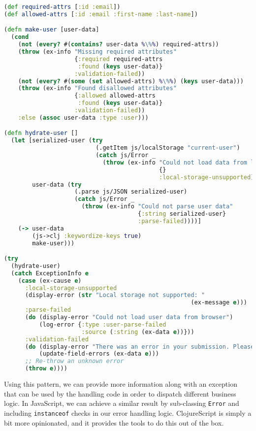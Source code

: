 \documentclass[10pt,twoside,openright]{memoir}
\begin{document}
\begin{lstlisting}[language=Clojure, caption={Using ExceptionInfo}]
(def required-attrs [:id :email])
(def allowed-attrs [:id :email :first-name :last-name])

(defn make-user [user-data]
  (cond
    (not (every? #(contains? user-data %\%%) required-attrs))
    (throw (ex-info "Missing required attributes"
                    {:required required-attrs
                     :found (keys user-data)}
                    :validation-failed))
    (not (every? #(some (set allowed-attrs) %\%%) (keys user-data)))
    (throw (ex-info "Found disallowed attributes"
                    {:allowed allowed-attrs
                     :found (keys user-data)}
                    :validation-failed))
    :else (assoc user-data :type :user)))

(defn hydrate-user []
  (let [serialized-user (try
                          (.getItem js/localStorage "current-user")
                          (catch js/Error _
                            (throw (ex-info "Could not load data from localStorage"
                                            {}
                                            :local-storage-unsupported))))
        user-data (try
                    (.parse js/JSON serialized-user)
                    (catch js/Error _
                      (throw (ex-info "Could not parse user data"
                                      {:string serialized-user}
                                      :parse-failed))))]
    (-> user-data
        (js->clj :keywordize-keys true)
        make-user)))

(try
  (hydrate-user)
  (catch ExceptionInfo e
    (case (ex-cause e)
      :local-storage-unsupported
      (display-error (str "Local storage not supported: "
                                                     (ex-message e)))
      :parse-failed
      (do (display-error "Could not load user data from browser")
          (log-error {:type :user-parse-failed
                      :source (:string (ex-data e))}))
      :validation-failed
      (do (display-error "There was an error in your submission. Please correct it before continuing.")
          (update-field-errors (ex-data e)))
      ;; Re-throw an unknown error
      (throw e))))
\end{lstlisting}

Using this pattern, we can provide more information along with an
exception that can be used by the handling code in order to dispatch
different business logic. In JavaScript, we can achieve a similar result
by sub-classing \texttt{Error} and including \texttt{instanceof} checks
in our error handling logic. ClojureScript is simply a bit more
opinionated, and it provides the tools to do this out of the box.
\end{document}
